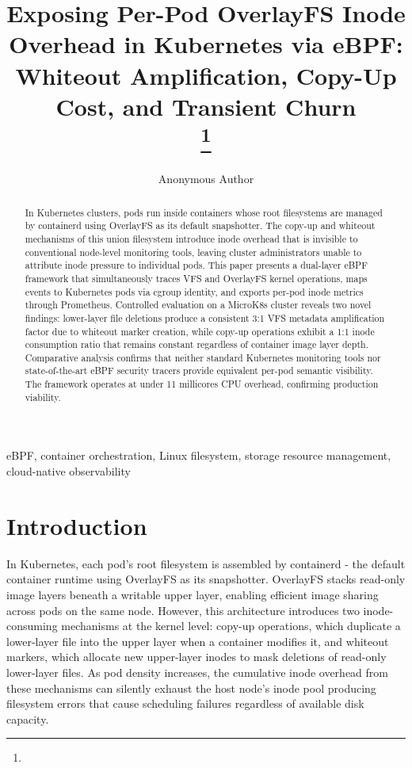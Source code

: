 \documentclass[conference]{IEEEtran}
\begin{document}
\title{Exposing Per-Pod OverlayFS Inode Overhead in Kubernetes via eBPF: Whiteout Amplification, Copy-Up Cost, and Transient Churn\\

\thanks{}
}

\author{Anonymous Author}

\maketitle

\begin{abstract}
In Kubernetes clusters, pods run inside containers whose root filesystems are managed by containerd using OverlayFS as its default snapshotter. The copy-up and whiteout mechanisms of this union filesystem introduce inode overhead that is invisible to conventional node-level monitoring tools, leaving cluster administrators unable to attribute inode pressure to individual pods. This paper presents a dual-layer eBPF framework that simultaneously traces VFS and OverlayFS kernel operations, maps events to Kubernetes pods via cgroup identity, and exports per-pod inode metrics through Prometheus. Controlled evaluation on a MicroK8s cluster reveals two novel findings: lower-layer file deletions produce a consistent 3:1 VFS metadata amplification factor due to whiteout marker creation, while copy-up operations exhibit a 1:1 inode consumption ratio that remains constant regardless of container image layer depth. Comparative analysis confirms that neither standard Kubernetes monitoring tools nor state-of-the-art eBPF security tracers provide equivalent per-pod semantic visibility. The framework operates at under 11 millicores CPU overhead, confirming production viability.
\end{abstract}

\begin{IEEEkeywords}
eBPF, container orchestration, Linux filesystem, storage resource management, cloud-native observability
\end{IEEEkeywords}

\section{Introduction}

In Kubernetes, each pod's root filesystem is assembled by containerd - the default container runtime using OverlayFS as its snapshotter. OverlayFS stacks read-only image layers beneath a writable upper layer, enabling efficient image sharing across pods on the same node. However, this architecture introduces two inode-consuming mechanisms at the kernel level: copy-up operations, which duplicate a lower-layer file into the upper layer when a container modifies it, and whiteout markers, which allocate new upper-layer inodes to mask deletions of read-only lower-layer files. As pod density increases, the cumulative inode overhead from these mechanisms can silently exhaust the host node's inode pool producing filesystem errors that cause scheduling failures regardless of available disk capacity.
\end{document}
